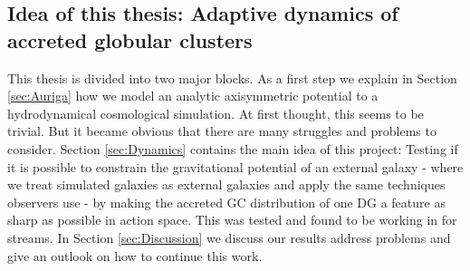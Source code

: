 \subsection{Idea of this thesis: Adaptive dynamics of accreted globular clusters}
This thesis is divided into two major blocks. As a first step we explain in Section \ref{sec:Auriga} how we model an analytic axisymmetric potential to a hydrodynamical cosmological simulation. At first thought, this seems to be trivial. But it became obvious that there are many struggles and problems to consider. Section \ref{sec:Dynamics} contains the main idea of this project: Testing if it is possible to constrain the gravitational potential of an external galaxy - where we treat simulated galaxies as external galaxies and apply the same techniques observers use - by making the accreted \ac{GC} distribution of one \ac{DG} a feature as sharp as possible in action space. This was tested and found to be working in \citet{Sanderson...gravpotstreams...2017} for streams. In Section \ref{sec:Discussion} we discuss our results address problems and give an outlook on how to continue this work.